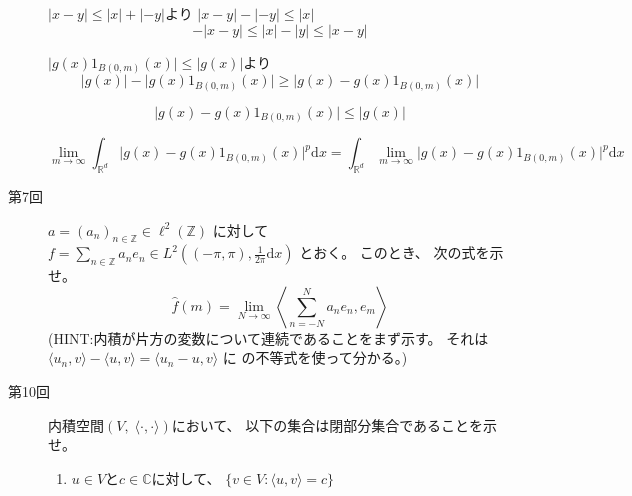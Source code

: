 \documentclass[12pt,b5paper]{ltjsarticle}
\begin{document}
\begin{description}
    $|x-y| \leq |x|+|-y|$より
    $|x-y| - |-y| \leq |x|$
    \begin{equation}
        -|x-y| \leq |x|-|y| \leq |x-y| 
    \end{equation}

    $\lvert g(x)1_{B(0,m)}(x) \rvert \leq \lvert g(x) \rvert$より
    \begin{equation}
        \lvert g(x) \rvert - \lvert g(x)1_{B(0,m)}(x) \rvert
        \geq \lvert g(x) - g(x)1_{B(0,m)}(x) \rvert
    \end{equation}


    \begin{equation}
        \lvert g(x) - g(x)1_{B(0,m)}(x) \rvert
        \leq
        \lvert g(x) \rvert
    \end{equation}
    
    \begin{equation}
        \lim_{m\to\infty}\int_{\mathbb{R}^{d}}
        \lvert g(x) - g(x)1_{B(0,m)}(x) \rvert^{p}
        \mathrm{d}x
        =
        \int_{\mathbb{R}^{d}} \lim_{m\to\infty}
        \lvert g(x) - g(x)1_{B(0,m)}(x) \rvert^{p}
        \mathrm{d}x
    \end{equation}
    

    \hrulefill


 \item [第7回]
      $a = (a_{n})_{n\in\mathbb{Z}} \in \ell^{2}(\mathbb{Z})$
      に対して
      $f=\sum_{n\in\mathbb{Z}} a_{n}e_{n}
             \in L^{2}((-\pi,\pi),\frac{1}{2\pi}\mathrm{d}x)$
      とおく。
      このとき、
      次の式を示せ。
      \begin{equation}
       \hat{f}(m) = \lim_{N\to\infty}
        \left\langle \sum_{n=-N}^{N}a_{n}e_{n},e_{m} \right\rangle
      \end{equation}
      (HINT:内積が片方の変数について連続であることをまず示す。
      それは$\langle u_{n},v\rangle - \langle u,v\rangle
             = \langle u_{n}-u,v \rangle$ に
      の不等式を使って分かる。)

             \dotfill




            \hrulefill

\newpage

 \item [第10回]
      内積空間$(V,\; \langle \cdot , \cdot \rangle)$において、
      以下の集合は閉部分集合であることを示せ。
      \begin{enumerate}
       \item
            $u\in V$と$c\in \mathbb{C}$に対して、
            $\{ v\in V : \langle u,v\rangle =c \}$


\end{enumerate}
\end{description}
\end{document}
